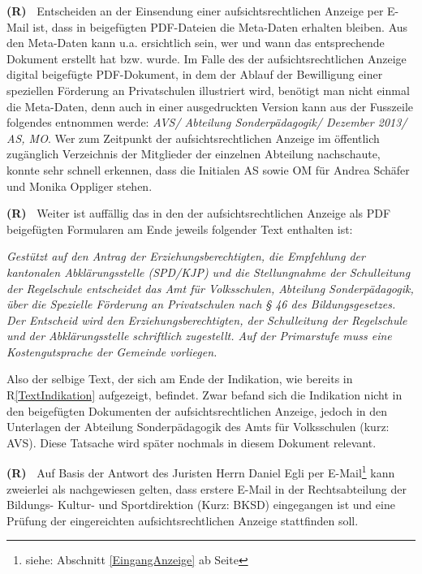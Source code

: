 \documentclass[paper=a4,fontsize=12pt, oneside, numbers=noenddot]{scrbook}
\newcounter{rz}
\newcommand{\Rz}{
	\addtocounter{rz}{1}\textbf{(R\arabic{rz})~}
}
\newcommand{\footnoteExt}[1]{\footnote{siehe: Abschnitt \ref{#1} ab Seite \pageref{#1}}}
\begin{document}
\Rz Entscheiden an der Einsendung einer aufsichtsrechtlichen Anzeige per E-Mail ist, dass in beigefügten PDF-Dateien die Meta-Daten erhalten bleiben. Aus den Meta-Daten kann u.a. ersichtlich sein, wer und wann das entsprechende Dokument erstellt hat bzw. wurde. Im Falle des der aufsichtsrechtlichen Anzeige digital beigefügte PDF-Dokument, in dem der Ablauf der Bewilligung einer speziellen Förderung an Privatschulen illustriert wird, benötigt man nicht einmal die Meta-Daten, denn auch in einer ausgedruckten Version kann aus der Fusszeile folgendes entnommen werde: \textit{AVS/ Abteilung Sonderpädagogik/ Dezember 2013/ AS, MO}. Wer zum Zeitpunkt der aufsichtsrechtlichen Anzeige im öffentlich zugänglich Verzeichnis der Mitglieder der einzelnen Abteilung nachschaute, konnte sehr schnell erkennen, dass die Initialen AS sowie OM für Andrea Schäfer und Monika Oppliger stehen.

\Rz Weiter ist auffällig das in den der aufsichtsrechtlichen Anzeige als PDF beigefügten Formularen am Ende jeweils folgender Text enthalten ist:

\begin{addmargin}[2.5em]{0em}\emph{Gestützt auf den Antrag der Erziehungsberechtigten, die Empfehlung der kantonalen Abklärungsstelle (SPD/KJP) und die Stellungnahme der Schulleitung der Regelschule entscheidet das Amt für Volksschulen, Abteilung Sonderpädagogik, über die Spezielle Förderung an Privatschulen nach § 46 des Bildungsgesetzes. Der Entscheid wird den Erziehungsberechtigten, der Schulleitung der Regelschule und der Abklärungsstelle schriftlich zugestellt. Auf der Primarstufe muss eine Kostengutsprache der Gemeinde vorliegen.		
}\end{addmargin}

Also der selbige Text, der sich am Ende der Indikation, wie bereits in R\ref{TextIndikation} aufgezeigt, befindet. Zwar befand sich die Indikation nicht in den beigefügten Dokumenten der aufsichtsrechtlichen Anzeige, jedoch in den Unterlagen der Abteilung Sonderpädagogik des Amts für Volksschulen (kurz: AVS). Diese Tatsache wird später nochmals in diesem Dokument relevant.

\Rz Auf Basis der Antwort des Juristen Herrn Daniel Egli per E-Mail\footnoteExt{EingangAnzeige} kann zweierlei als nachgewiesen gelten, dass erstere E-Mail in der Rechtsabteilung der Bildungs- Kultur- und Sportdirektion (Kurz: BKSD) eingegangen ist und eine Prüfung der eingereichten aufsichtsrechtlichen Anzeige stattfinden soll. 
\end{document}
